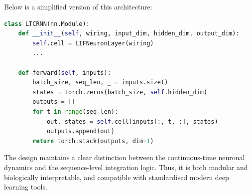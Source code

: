 \noindent Below is a simplified version of this architecture:
\begin{lstlisting}[language=Python, caption={Structure of the LTCRNN module}]
class LTCRNN(nn.Module):
    def __init__(self, wiring, input_dim, hidden_dim, output_dim):
        self.cell = LIFNeuronLayer(wiring)
        ...
        
    def forward(self, inputs):
        batch_size, seq_len, _ = inputs.size()
        states = torch.zeros(batch_size, self.hidden_dim)
        outputs = []
        for t in range(seq_len):
            out, states = self.cell(inputs[:, t, :], states)
            outputs.append(out)
        return torch.stack(outputs, dim=1)
\end{lstlisting}

The design maintains a clear distinction between the continuous-time neuronal dynamics and the sequence-level integration logic. Thus, it is both modular and biologically interpretable, and compatible with standardised modern deep learning tools.

